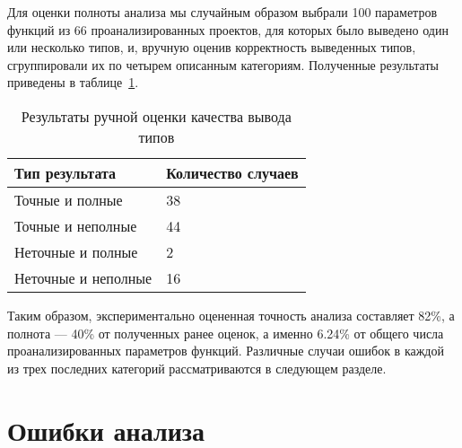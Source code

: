 Для оценки полноты анализа мы случайным образом выбрали 100 параметров функций
из 66 проанализированных проектов, для которых было выведено один или несколько
типов, и, вручную оценив корректность выведенных типов, сгруппировали их по
четырем описанным категориям. Полученные результаты приведены в
таблице~\ref{tab:manual-analysis-results}.

\begin{table}[H]
  \small
  \centering
  \caption{Результаты ручной оценки качества вывода типов}
  \label{tab:manual-analysis-results}
    \begin{tabularx}{0.7\textwidth}{|X|X|}
      \hline
      Тип результата & Количество случаев 
      \\ \hline 
      Точные и полные & 38
      \\ \hline
      Точные и неполные & 44 
      \\ \hline
      Неточные и полные & 2
      \\ \hline
      Неточные и неполные & 16
      \\ \hline
    \end{tabularx}
\end{table}

Таким образом, экспериментально оцененная точность анализа составляет 82\%, а
полнота --- 40\% от полученных ранее оценок, а именно 6.24\%  от общего числа
проанализированных параметров функций. Различные случаи ошибок в каждой
из трех последних категорий рассматриваются в следующем разделе.

\section{Ошибки анализа}
\label{sec:analysis-errors}





